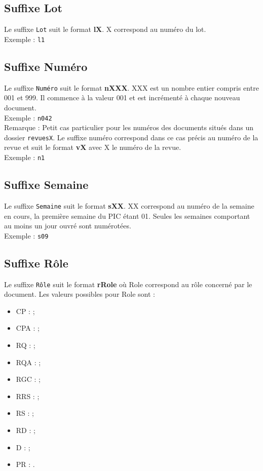 \subsection{Suffixe Lot}
\label{suffixe_lot}


Le suffixe \verb+Lot+ suit le format \textbf{lX}. X correspond au numéro du lot.\\

Exemple : \verb+l1+\\


\subsection{Suffixe Numéro}
\label{suffixe_numero}

Le suffixe \verb+Numéro+ suit le format \textbf{nXXX}. XXX est un nombre entier compris entre 001 et 999. Il commence à la valeur 001 et est incrémenté à chaque nouveau document.\\

Exemple : \verb+n042+\\

Remarque : Petit cas particulier pour les numéros des documents situés dans un dossier \verb+revuesX+. Le suffixe numéro correspond dans ce cas précis au numéro de la revue et suit le format \textbf{vX} avec X le numéro de la revue.\\


Exemple : \verb+n1+\\

\subsection{Suffixe Semaine}
\label{suffixe_semaine}

Le suffixe \verb+Semaine+ suit le format \textbf{sXX}. XX correspond au numéro de la semaine en cours, la première semaine du PIC étant 01. Seules les semaines comportant au moins un jour ouvré sont numérotées.\\

Exemple : \verb+s09+

\subsection{Suffixe Rôle}
\label{suffixe_role}

Le suffixe \verb+Rôle+ suit le format \textbf{rRole} où Role correspond au rôle concerné par le document. Les valeurs possibles pour Role sont : 
\begin{itemize}
\item CP :  \CP;
\item CPA : \CPA;
\item RQ : \RQ;
\item RQA : \RQA;
\item RGC : \RGC;
\item RRS : \RRS;
\item RS : \RS;
\item RD : \RD;
\item D : \D;
\item PR : \PDR.\\
\end{itemize}

